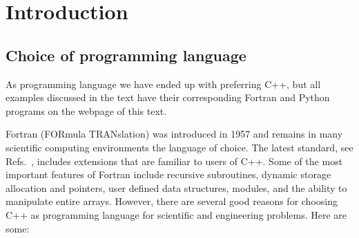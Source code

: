 
\chapter{Introduction}

\section{Choice of programming language}

As programming language we have ended up with preferring 
C++, but all examples discussed in the text have their 
corresponding Fortran and Python programs on the webpage of this text.
 
Fortran (FORmula TRANslation) was introduced in 1957 and remains in many 
scientific computing environments the language of choice.
The latest standard, see Refs.~\cite{f95ref,metcalf1996,marshall1995,f2003}, 
includes extensions that are
familiar to users of C++. 
Some of the most important features of Fortran  include recursive
subroutines, dynamic storage allocation and pointers, 
user defined data structures, modules,
and the ability to manipulate entire arrays. 
However, there are several good reasons for 
choosing C++ as programming language for scientific and engineering
problems. Here are some:
